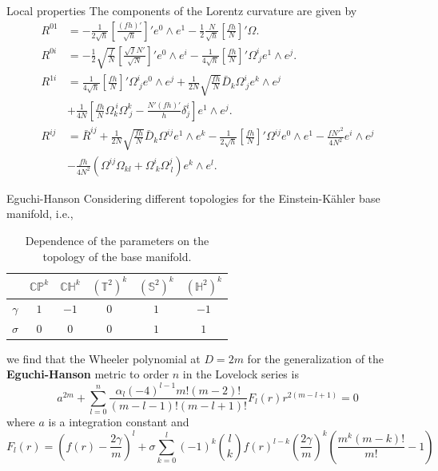 \documentclass[aspectratio=169,xcolor=dvipsnames]{beamer}
\begin{document}
\begin{frame}{Local properties}\justifying
The components of the Lorentz curvature are given by
    \begin{align*}
    R^{01}&=-\frac{1}{2\sqrt{h}}\left[\frac{(fh)'}{\sqrt{h}}\right]'e^0\wedge e^1-\frac{1}{2}\frac{N}{\sqrt{h}}\left[\frac{fh}{N}\right]'\Omega.\\
    R^{0i}&=-\frac{1}{2}\sqrt{\frac{f}{N}}\left[\frac{\sqrt{f}N'}{\sqrt{N}}\right]'e^0\wedge e^{i}-\frac{1}{4\sqrt{h}}\left[\frac{fh}{N}\right]'\Omega^{i}_{\ j}e^1\wedge e^j.\\
    R^{1i}&=\frac{1}{4\sqrt{h}}\left[\frac{fh}{N}\right]'\Omega^{i}_{\ j}e^0\wedge e^j+\frac{1}{2N}\sqrt{\frac{fh}{N}}\bar{D}_k\Omega^{i}_{\ j}e^k\wedge e^j \\
    &+\frac{1}{4N}\left[\frac{fh}{N}\Omega_k^{\ i}\Omega^k_{\ j}-\frac{N'(fh)'}{h}\delta^i_j\right]e^1\wedge e^j.\\
    R^{ij}&=\bar{R}^{ij}+\frac{1}{2N}\sqrt{\frac{fh}{N}}\bar{D}_k\Omega^{ij}e^1\wedge e^k-\frac{1}{2\sqrt{h}}\left[\frac{fh}{N}\right]'\Omega^{ij}e^0\wedge e^1-\frac{fN'^2}{4N^2}e^{i}\wedge e^j\\
    &-\frac{fh}{4N^2}\left(\Omega^{ij}\Omega_{kl}+\Omega^{i}_{\ k}\Omega^j_{\ l}\right)e^k\wedge e^l.
\end{align*}
\end{frame}
\begin{frame}{Eguchi-Hanson}\justifying
Considering different topologies for the Einstein-K\"ahler base manifold, i.e.,
    \begin{table}
    \centering
    \begin{tabular}{cccccc}
         &$\mathbb{CP}^k$  &$\mathbb{CH}^k$  & $(\mathbb{T}^2)^k$ & $(\mathbb{S}^2)^k$ & $(\mathbb{H}^2)^k$\\\hline
         $\gamma$& $1$ & $-1$ & $0$ &$1$  & $-1$\\\hline
         $\sigma$& $0$ & $0$ &$0$  &$1$  & $1$\\\hline
    \end{tabular}
    \caption{Dependence of the parameters on the topology of the base manifold.}
    \label{tab:2}
\end{table}
we find that the Wheeler polynomial at $D=2m$ for the generalization of the \textbf{Eguchi-Hanson} metric to order $n$ in the Lovelock series is
    \begin{equation*}
   a^{2m} +\sum_{l=0}^{n}\frac{\alpha_l(-4)^{l-1}m!(m-2)!}{(m-l-1)!(m-l+1)!}F_l(r)r^{2(m-l+1)}=0
\end{equation*}
where $a$ is a integration constant and
\begin{equation*}
     F_l(r)=\left(f(r)-\frac{2\gamma}{m}\right)^l+\sigma \sum_{k=0}^l(-1)^k\binom{l}{k}f(r)^{l-k}\left(\frac{2\gamma}{m}\right)^k\left(\frac{m^k(m-k)!}{m!}-1\right)
\end{equation*}
\end{frame}
\end{document}

